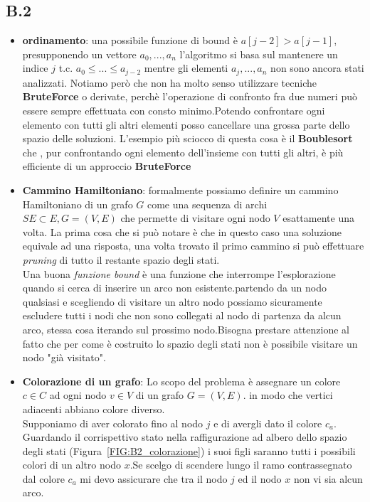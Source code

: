 \documentclass[a4paper]{article}
\begin{document}
\subsection{B.2}
\begin{itemize}
	\item \textbf{ordinamento}: una possibile funzione di bound è $a[j-2] > a[j-1]$, presupponendo un vettore $a_0, ... , a_n$ l'algoritmo si basa sul mantenere un indice $j$ t.c. $a_0 \leq ... \leq a_{j-2}$ mentre gli elementi $a_{j}, ..., a_{n}$ non sono ancora stati analizzati.
	Notiamo però che non ha molto senso utilizzare tecniche \textbf{BruteForce} o derivate, perchè l'operazione di confronto fra due numeri può essere sempre effettuata con consto minimo.Potendo confrontare ogni elemento con tutti gli altri elementi posso cancellare una grossa parte dello spazio delle soluzioni.
	L'esempio più sciocco di questa cosa è il \textbf{Boublesort} che , pur confrontando ogni elemento dell'insieme con tutti gli altri, è più efficiente di un approccio \textbf{BruteForce}
	\item \textbf{Cammino Hamiltoniano}: formalmente possiamo definire un cammino Hamiltoniano di un grafo $G$ come una sequenza di archi $SE \subset E, G= (V,E)$ che permette di visitare ogni nodo $V$ esattamente una volta.
	La prima cosa che si può notare è che in questo caso una soluzione equivale ad una risposta, una volta trovato il primo cammino si può effettuare \textit{pruning} di tutto il restante spazio degli stati.\\
	Una buona \textit{funzione bound} è una funzione che interrompe l'esplorazione quando si cerca di inserire un arco non esistente.partendo da un nodo qualsiasi e scegliendo di visitare un altro nodo possiamo sicuramente escludere tutti i nodi che non sono collegati al nodo di partenza da alcun arco, stessa cosa iterando sul prossimo nodo.Bisogna prestare attenzione al fatto che per come è costruito lo spazio degli stati non è possibile visitare un nodo "già visitato".
	\item \textbf{Colorazione di un grafo}: Lo scopo del problema è assegnare un colore $c \in C$ ad ogni nodo $v \in V$ di un grafo $G=(V,E)$. in modo che vertici adiacenti abbiano colore diverso.\\
	Supponiamo di aver colorato fino al nodo $j$ e di avergli dato il colore $c_a$.
	Guardando il corrispettivo stato nella raffigurazione ad albero dello spazio degli stati (Figura~\ref{FIG:B2_colorazione}) i suoi figli saranno tutti i possibili colori di un altro nodo $x$.Se scelgo di scendere lungo il ramo contrassegnato dal colore $c_a$ mi devo assicurare che tra il nodo $j$ ed il nodo $x$ non vi sia alcun arco.\\

\end{itemize}
\end{document}
